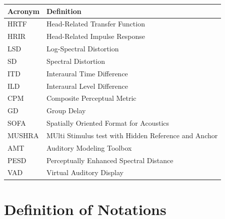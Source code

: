 \documentclass[12pt,a4paper]{article}
\begin{document}
\begin{table}[h!]
\centering
\begin{tabular}{|l|l|}
\hline
\textbf{Acronym} & \textbf{Definition} \\
\hline
HRTF & Head-Related Transfer Function \\
\hline
HRIR & Head-Related Impulse Response \\
\hline
LSD & Log-Spectral Distortion \\
\hline
SD & Spectral Distortion \\
\hline
ITD & Interaural Time Difference \\
\hline
ILD & Interaural Level Difference \\
\hline
CPM & Composite Perceptual Metric \\
\hline
GD & Group Delay \\
\hline
SOFA & Spatially Oriented Format for Acoustics \\
\hline
MUSHRA & MUlti Stimulus test with Hidden Reference and Anchor \\
\hline
AMT & Auditory Modeling Toolbox \\
\hline
PESD & Perceptually Enhanced Spectral Distance \\
\hline
VAD & Virtual Auditory Display \\
\hline
\end{tabular}
\end{table}

\newpage

\section*{Definition of Notations}
\end{document}
